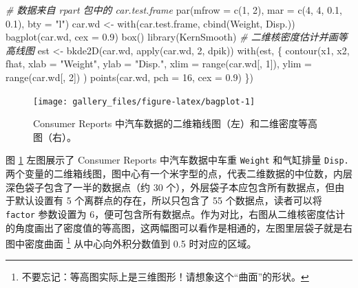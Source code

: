 \documentclass[
  b5paper,
  UTF8,twoside]{book}
\newenvironment{Shaded}{\begin{snugshade}}{\end{snugshade}}
\newcommand{\AttributeTok}[1]{\textcolor[rgb]{0.77,0.63,0.00}{#1}}
\newcommand{\CommentTok}[1]{\textcolor[rgb]{0.56,0.35,0.01}{\textit{#1}}}
\newcommand{\DecValTok}[1]{\textcolor[rgb]{0.00,0.00,0.81}{#1}}
\newcommand{\FloatTok}[1]{\textcolor[rgb]{0.00,0.00,0.81}{#1}}
\newcommand{\FunctionTok}[1]{\textcolor[rgb]{0.00,0.00,0.00}{#1}}
\newcommand{\NormalTok}[1]{#1}
\newcommand{\OtherTok}[1]{\textcolor[rgb]{0.56,0.35,0.01}{#1}}
\newcommand{\StringTok}[1]{\textcolor[rgb]{0.31,0.60,0.02}{#1}}
\begin{document}
\begin{Shaded}
\begin{Highlighting}[]
\CommentTok{\# 数据来自 rpart 包中的 car.test.frame}
\FunctionTok{par}\NormalTok{(}\AttributeTok{mfrow =} \FunctionTok{c}\NormalTok{(}\DecValTok{1}\NormalTok{, }\DecValTok{2}\NormalTok{), }\AttributeTok{mar =} \FunctionTok{c}\NormalTok{(}\DecValTok{4}\NormalTok{, }\DecValTok{4}\NormalTok{, }\FloatTok{0.1}\NormalTok{, }\FloatTok{0.1}\NormalTok{), }\AttributeTok{bty =} \StringTok{"l"}\NormalTok{)}
\NormalTok{car.wd }\OtherTok{\textless{}{-}} \FunctionTok{with}\NormalTok{(car.test.frame, }\FunctionTok{cbind}\NormalTok{(Weight, Disp.))}
\FunctionTok{bagplot}\NormalTok{(car.wd, }\AttributeTok{cex =} \FloatTok{0.9}\NormalTok{)}
\FunctionTok{box}\NormalTok{()}
\FunctionTok{library}\NormalTok{(KernSmooth) }\CommentTok{\# 二维核密度估计并画等高线图}
\NormalTok{est }\OtherTok{\textless{}{-}} \FunctionTok{bkde2D}\NormalTok{(car.wd, }\FunctionTok{apply}\NormalTok{(car.wd, }\DecValTok{2}\NormalTok{, dpik))}
\FunctionTok{with}\NormalTok{(est, \{}
  \FunctionTok{contour}\NormalTok{(x1, x2, fhat,}
    \AttributeTok{xlab =} \StringTok{"Weight"}\NormalTok{, }\AttributeTok{ylab =} \StringTok{"Disp."}\NormalTok{,}
    \AttributeTok{xlim =} \FunctionTok{range}\NormalTok{(car.wd[, }\DecValTok{1}\NormalTok{]),}
    \AttributeTok{ylim =} \FunctionTok{range}\NormalTok{(car.wd[, }\DecValTok{2}\NormalTok{])}
\NormalTok{  )}
  \FunctionTok{points}\NormalTok{(car.wd, }\AttributeTok{pch =} \DecValTok{16}\NormalTok{, }\AttributeTok{cex =} \FloatTok{0.9}\NormalTok{)}
\NormalTok{\})}
\end{Highlighting}
\end{Shaded}

\begin{figure}

{\centering \texttt{[image: gallery\_files/figure-latex/bagplot-1]} 

}

\caption[Consumer Reports 中汽车数据的二维箱线图和密度等高图]{Consumer Reports 中汽车数据的二维箱线图（左）和二维密度等高图（右）。}\label{fig:bagplot}
\end{figure}

图 \ref{fig:bagplot} 左图展示了 Consumer Reports 中汽车数据中车重 \texttt{Weight} 和气缸排量 \texttt{Disp.} 两个变量的二维箱线图，图中心有一个米字型的点，代表二维数据的中位数，内层深色袋子包含了一半的数据点（约 30 个），外层袋子本应包含所有数据点，但由于默认设置有 5 个离群点的存在，所以只包含了 55 个数据点，读者可以将 \texttt{factor} 参数设置为 6，便可包含所有数据点。作为对比，右图从二维核密度估计的角度画出了密度值的等高图，这两幅图可以看作是相通的，左图里层袋子就是右图中密度曲面 \footnote{不要忘记：等高图实际上是三维图形！请想象这个``曲面''的形状。} 从中心向外积分数值到 0.5 时对应的区域。
\end{document}
